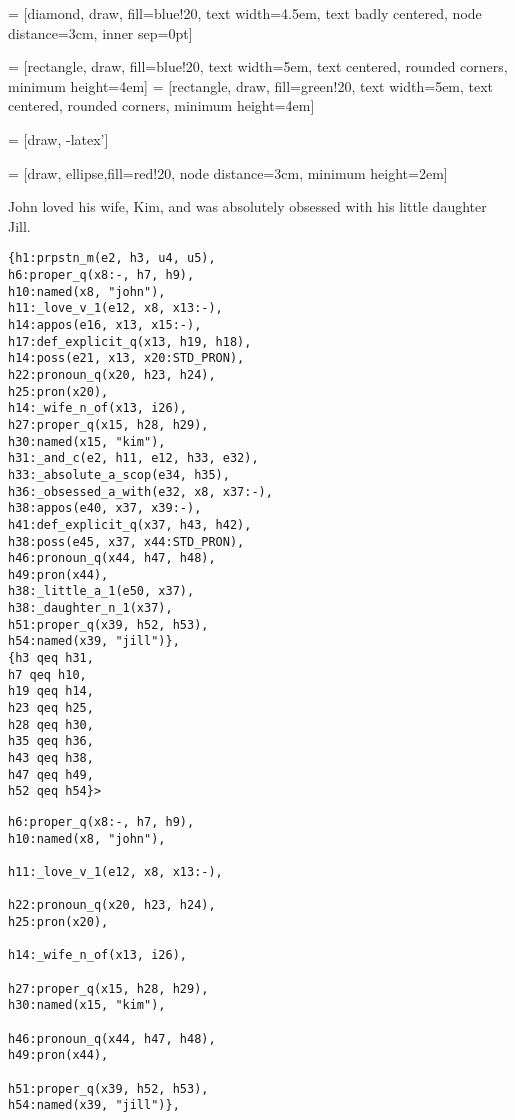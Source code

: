 \documentclass[landscape]{article}
\begin{document}
\pagestyle{empty}

 = [diamond, draw, fill=blue!20, 
    text width=4.5em, text badly centered, node distance=3cm, inner sep=0pt]

 = [rectangle, draw, fill=blue!20, 
    text width=5em, text centered, rounded corners, minimum height=4em]
 = [rectangle, draw, fill=green!20, 
    text width=5em, text centered, rounded corners, minimum height=4em]

 = [draw, -latex']

 = [draw, ellipse,fill=red!20, node distance=3cm,
    minimum height=2em]

John loved his wife, Kim, and was absolutely obsessed with his little daughter Jill.

\begin{verbatim}
{h1:prpstn_m(e2, h3, u4, u5), 
h6:proper_q(x8:-, h7, h9), 
h10:named(x8, "john"), 
h11:_love_v_1(e12, x8, x13:-), 
h14:appos(e16, x13, x15:-), 
h17:def_explicit_q(x13, h19, h18), 
h14:poss(e21, x13, x20:STD_PRON), 
h22:pronoun_q(x20, h23, h24), 
h25:pron(x20), 
h14:_wife_n_of(x13, i26), 
h27:proper_q(x15, h28, h29), 
h30:named(x15, "kim"), 
h31:_and_c(e2, h11, e12, h33, e32), 
h33:_absolute_a_scop(e34, h35), 
h36:_obsessed_a_with(e32, x8, x37:-), 
h38:appos(e40, x37, x39:-), 
h41:def_explicit_q(x37, h43, h42), 
h38:poss(e45, x37, x44:STD_PRON), 
h46:pronoun_q(x44, h47, h48), 
h49:pron(x44), 
h38:_little_a_1(e50, x37), 
h38:_daughter_n_1(x37), 
h51:proper_q(x39, h52, h53), 
h54:named(x39, "jill")}, 
{h3 qeq h31, 
h7 qeq h10, 
h19 qeq h14, 
h23 qeq h25, 
h28 qeq h30, 
h35 qeq h36, 
h43 qeq h38, 
h47 qeq h49, 
h52 qeq h54}> 
\end{verbatim}


\begin{verbatim}
h6:proper_q(x8:-, h7, h9), 
h10:named(x8, "john"), 

h11:_love_v_1(e12, x8, x13:-), 

h22:pronoun_q(x20, h23, h24), 
h25:pron(x20), 

h14:_wife_n_of(x13, i26), 

h27:proper_q(x15, h28, h29), 
h30:named(x15, "kim"), 

h46:pronoun_q(x44, h47, h48), 
h49:pron(x44), 

h51:proper_q(x39, h52, h53), 
h54:named(x39, "jill")}, 
\end{verbatim}
\end{document}
